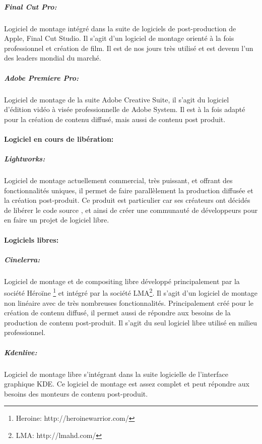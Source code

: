 \subparagraph{Final Cut Pro:}

Logiciel de montage intégré dans la suite de logiciels de
post-production de Apple, Final Cut Studio. Il s'agit d'un logiciel
de montage orienté à la fois professionnel et création de film. Il
est de nos jours très utilisé et est devenu l'un des leaders mondial
du marché.

\subparagraph{Adobe Premiere Pro:}

Logiciel de montage de la suite Adobe Creative Suite, il s'agit du
logiciel d'édition vidéo à visée professionnelle de Adobe System. Il
est à la fois adapté pour la création de contenu diffusé, mais aussi
de contenu post produit.

\paragraph {Logiciel en cours de libération:}

\subparagraph{Lightworks:}

Logiciel de montage actuellement commercial, très puissant, et offrant
des fonctionnalités uniques, il permet de faire parallèlement la
production diffusée et la création post-produit. Ce produit est
particulier car ses créateurs ont décidés de libérer le code source
\cite{TheLightworksOpenSourceProjectStartHere}, et ainsi  de créer une
communauté de développeurs pour en faire un projet de logiciel libre.

\paragraph {Logiciels libres:}

\subparagraph{Cinelerra:}

Logiciel de montage et de compositing libre développé principalement
par la société Héroïne \footnote{Heroine: http://heroinewarrior.com/}
et intégré par la société LMA\footnote{LMA: http://lmahd.com/}. Il
s'agit d'un logiciel de montage non linéaire avec de très nombreuses
fonctionnalités. Principalement créé pour le création de contenu
diffusé, il permet aussi de répondre aux besoins de la production
de contenu post-produit. Il s'agit du seul logiciel libre utilisé en
milieu professionnel.

\subparagraph{Kdenlive:}

Logiciel de montage libre s'intégrant dans la suite logicielle de
l'interface graphique KDE.  Ce logiciel de montage est assez complet et
peut répondre aux besoins des monteurs de contenu post-produit.


